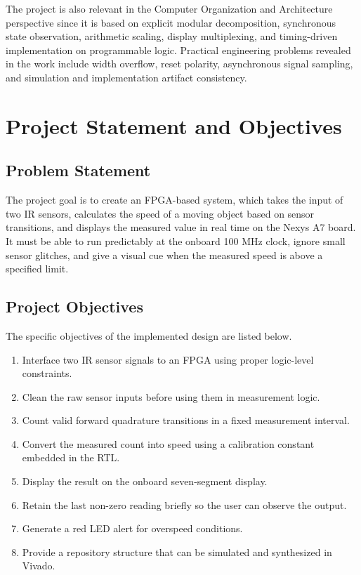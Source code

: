 \documentclass[conference,a4paper]{IEEEtran}
\begin{document}
The project is also relevant in the Computer Organization and Architecture perspective since it is based on explicit modular decomposition, synchronous state observation, arithmetic scaling, display multiplexing, and timing-driven implementation on programmable logic. Practical engineering problems revealed in the work include width overflow, reset polarity, asynchronous signal sampling, and simulation and implementation artifact consistency.

\section{Project Statement and Objectives}

\subsection{Problem Statement}
The project goal is to create an FPGA-based system, which takes the input of two IR sensors, calculates the speed of a moving object based on sensor transitions, and displays the measured value in real time on the Nexys A7 board. It must be able to run predictably at the onboard 100 MHz clock, ignore small sensor glitches, and give a visual cue when the measured speed is above a specified limit.

\subsection{Project Objectives}
The specific objectives of the implemented design are listed below.
\begin{enumerate}
\item Interface two IR sensor signals to an FPGA using proper logic-level constraints.
\item Clean the raw sensor inputs before using them in measurement logic.
\item Count valid forward quadrature transitions in a fixed measurement interval.
\item Convert the measured count into speed using a calibration constant embedded in the RTL.
\item Display the result on the onboard seven-segment display.
\item Retain the last non-zero reading briefly so the user can observe the output.
\item Generate a red LED alert for overspeed conditions.
\item Provide a repository structure that can be simulated and synthesized in Vivado.
\end{enumerate}
\end{document}
